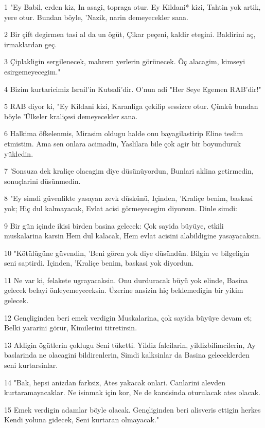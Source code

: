 \par 1 "Ey Babil, erden kiz, In asagi, topraga otur. Ey Kildani* kizi, Tahtin yok artik, yere otur. Bundan böyle, 'Nazik, narin demeyecekler sana.
\par 2 Bir çift degirmen tasi al da un ögüt, Çikar peçeni, kaldir etegini. Baldirini aç, irmaklardan geç.
\par 3 Çiplakligin sergilenecek, mahrem yerlerin görünecek. Öç alacagim, kimseyi esirgemeyecegim."
\par 4 Bizim kurtaricimiz Israil'in Kutsali'dir. O'nun adi "Her Seye Egemen RAB'dir!"
\par 5 RAB diyor ki, "Ey Kildani kizi, Karanliga çekilip sessizce otur. Çünkü bundan böyle 'Ülkeler kraliçesi demeyecekler sana.
\par 6 Halkima öfkelenmis, Mirasim oldugu halde onu bayagilastirip Eline teslim etmistim. Ama sen onlara acimadin, Yaslilara bile çok agir bir boyunduruk yükledin.
\par 7 'Sonsuza dek kraliçe olacagim diye düsünüyordun, Bunlari aklina getirmedin, sonuçlarini düsünmedin.
\par 8 "Ey simdi güvenlikte yasayan zevk düskünü, Içinden, 'Kraliçe benim, baskasi yok; Hiç dul kalmayacak, Evlat acisi görmeyecegim diyorsun. Dinle simdi:
\par 9 Bir gün içinde ikisi birden basina gelecek: Çok sayida büyüye, etkili muskalarina karsin Hem dul kalacak, Hem evlat acisini alabildigine yasayacaksin.
\par 10 "Kötülügüne güvendin, 'Beni gören yok diye düsündün. Bilgin ve bilgeligin seni saptirdi. Içinden, 'Kraliçe benim, baskasi yok diyordun.
\par 11 Ne var ki, felakete ugrayacaksin. Onu durduracak büyü yok elinde, Basina gelecek belayi önleyemeyeceksin. Üzerine ansizin hiç beklemedigin bir yikim gelecek.
\par 12 Gençliginden beri emek verdigin Muskalarina, çok sayida büyüye devam et; Belki yararini görür, Kimilerini titretirsin.
\par 13 Aldigin ögütlerin çoklugu Seni tüketti. Yildiz falcilarin, yildizbilimcilerin, Ay baslarinda ne olacagini bildirenlerin, Simdi kalksinlar da Basina geleceklerden seni kurtarsinlar.
\par 14 "Bak, hepsi anizdan farksiz, Ates yakacak onlari. Canlarini alevden kurtaramayacaklar. Ne isinmak için kor, Ne de karsisinda oturulacak ates olacak.
\par 15 Emek verdigin adamlar böyle olacak. Gençliginden beri alisveris ettigin herkes Kendi yoluna gidecek, Seni kurtaran olmayacak."

